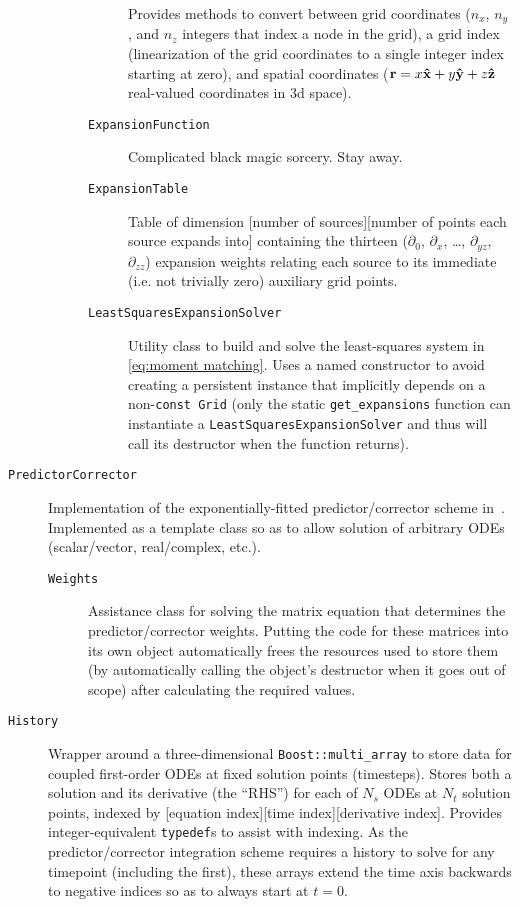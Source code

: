\begin{description}
\begin{description}
\begin{description}
            Provides methods to convert between grid coordinates ($n_x$, $n_y$, and $n_z$ integers that index a node in the grid), a grid index (linearization of the grid coordinates to a single integer index starting at zero), and spatial coordinates ($\vb{r} = x \vu{x} + y \vu{y} + z \vu{z}$ real-valued coordinates in 3d space).
          \item[\texttt{ExpansionFunction}] Complicated black magic sorcery. Stay away.
          \item[\texttt{ExpansionTable}] Table of dimension [number of sources][number of points each source expands into] containing the thirteen ($\partial_0$, $\partial_x$, \ldots, $\partial_{yz}$, $\partial_{zz}$) expansion weights relating each source to its immediate (i.e. not trivially zero) auxiliary grid points.
          \item[\texttt{LeastSquaresExpansionSolver}] Utility class to build and solve the least-squares system in \cref{eq:moment matching}.
            Uses a named constructor to avoid creating a persistent instance that implicitly depends on a non-\lstinline!const Grid! (only the static \lstinline!get_expansions! function can instantiate a \lstinline!LeastSquaresExpansionSolver! and thus will call its destructor when the function returns).
        \end{description}
    \end{description}
  \item[\texttt{PredictorCorrector}] Implementation of the exponentially-fitted predictor/corrector scheme in~\cite{Rokhlin}.
    Implemented as a template class so as to allow solution of arbitrary ODEs (scalar/vector, real/complex, etc.).
    \begin{description}
      \item[\texttt{Weights}] Assistance class for solving the matrix equation that determines the predictor/corrector weights.
        Putting the code for these matrices into its own object automatically frees the resources used to store them (by automatically calling the object's destructor when it goes out of scope) after calculating the required values.
    \end{description}
  \item[\texttt{History}] Wrapper around a three-dimensional \lstinline!Boost::multi_array! to store data for coupled first-order ODEs at fixed solution points (timesteps).
    Stores both a solution and its derivative (the ``RHS'') for each of $N_s$ ODEs at $N_t$ solution points, indexed by [equation index][time index][derivative index].
    Provides integer-equivalent \lstinline!typedef!s to assist with indexing.
    As the predictor/corrector integration scheme requires a history to solve for any timepoint (including the first), these arrays extend the time axis backwards to negative indices so as to always start at $t = 0$.
\end{description}

